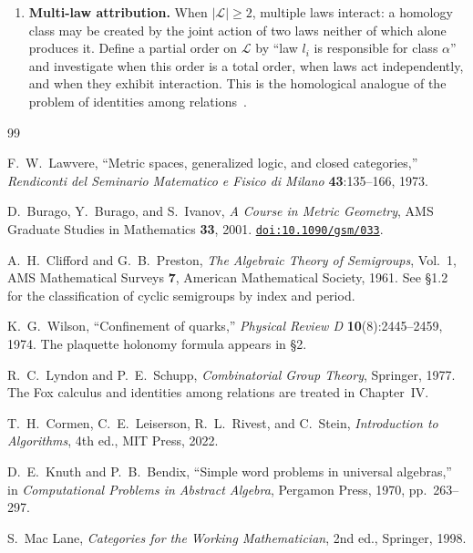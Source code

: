 \documentclass{article}
\newcommand{\doi}[1]{\href{https://doi.org/#1}{\texttt{doi:#1}}}
\theoremstyle{definition}
\theoremstyle{remark}
\begin{document}
\begin{enumerate}[label=(Q\arabic*)]
  \item \textbf{Multi-law attribution.} When $|\mathcal{L}| \geq 2$,
        multiple laws interact: a homology class may be created
        by the joint action of two laws neither of which alone
        produces it. Define a partial order on $\mathcal{L}$ by
        ``law $l_i$ is responsible for class $\alpha$'' and
        investigate when this order is a total order, when laws
        act independently, and when they exhibit interaction.
        This is the homological analogue of the problem of
        identities among relations~\cite{lyndonshupp}.
\end{enumerate}

\begin{thebibliography}{99}

F.~W.~Lawvere,
``Metric spaces, generalized logic, and closed categories,''
\textit{Rendiconti del Seminario Matematico e Fisico di Milano}
\textbf{43}:135--166, 1973.

D.~Burago, Y.~Burago, and S.~Ivanov,
\textit{A Course in Metric Geometry},
AMS Graduate Studies in Mathematics \textbf{33}, 2001.
\newblock \doi{10.1090/gsm/033}.

A.~H.~Clifford and G.~B.~Preston,
\textit{The Algebraic Theory of Semigroups}, Vol.~1,
AMS Mathematical Surveys \textbf{7}, American Mathematical
Society, 1961. See \S1.2 for the classification of cyclic
semigroups by index and period.

K.~G.~Wilson,
``Confinement of quarks,''
\textit{Physical Review D} \textbf{10}(8):2445--2459, 1974.
The plaquette holonomy formula appears in \S2.

R.~C.~Lyndon and P.~E.~Schupp,
\textit{Combinatorial Group Theory},
Springer, 1977. The Fox calculus and identities among relations
are treated in Chapter~IV.

T.~H.~Cormen, C.~E.~Leiserson, R.~L.~Rivest, and C.~Stein,
\textit{Introduction to Algorithms}, 4th ed., MIT Press, 2022.

D.~E.~Knuth and P.~B.~Bendix,
``Simple word problems in universal algebras,''
in \textit{Computational Problems in Abstract Algebra},
Pergamon Press, 1970, pp.~263--297.

S.~Mac Lane,
\textit{Categories for the Working Mathematician},
2nd ed., Springer, 1998.


\end{thebibliography}
\end{document}
